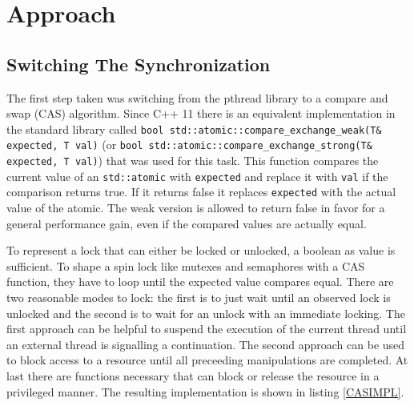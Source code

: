 

\chapter{Approach}

\section{Switching The Synchronization}
The first step taken was switching from the pthread library to a compare and swap (CAS) algorithm. Since C++ 11 there is an equivalent implementation in the standard library called \texttt{bool std::atomic::compare\_exchange\_weak(T\& expected, T val)} (or \texttt{bool std::atomic::compare\_exchange\_strong(T\& expected, T val)}) that was used for this task. This function compares the current value of an \texttt{std::atomic} with \texttt{expected} and replace it with \texttt{val} if the comparison returns true. If it returns false it replaces \texttt{expected} with the actual value of the atomic. The weak version is allowed to return false in favor for a general performance gain, even if the compared values are actually equal.

To represent a lock that can either be locked or unlocked, a boolean as value is sufficient. To shape a spin lock like mutexes and semaphores with a CAS function, they have to loop until the expected value compares equal. There are two reasonable modes to lock: the first is to just wait until an observed lock is unlocked and the second is to wait for an unlock with an immediate locking. The first approach can be helpful to suspend the execution of the current thread until an external thread is signalling a continuation. The second approach can be used to block access to a resource until all preceeding manipulations are completed. At last there are functions necessary that can block or release the resource in a privileged manner. The resulting implementation is shown in listing \ref{CASIMPL}.

